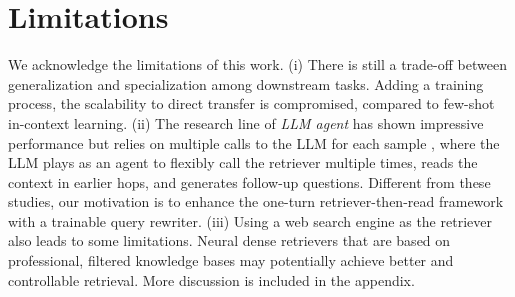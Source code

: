 \section*{Limitations}
We acknowledge the limitations of this work. (i) There is still a trade-off between generalization and specialization among downstream tasks. 
Adding a training process, the scalability to direct transfer is compromised, compared to few-shot in-context learning.
(ii) The research line of \textit{LLM agent} has shown impressive performance but relies on multiple calls to the LLM for each sample \cite{khattab2022dsp, yao2023react}, where the LLM plays as an agent to flexibly call the retriever multiple times, reads the context in earlier hops, and generates follow-up questions. Different from these studies, our motivation is to enhance the one-turn retriever-then-read framework with a trainable query rewriter.
(iii) Using a web search engine as the retriever also leads to some limitations. Neural dense retrievers that are based on professional, filtered knowledge bases may potentially achieve better and controllable retrieval. More discussion is included in the appendix.

